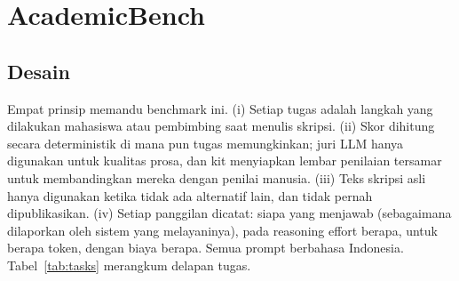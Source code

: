 \section{AcademicBench}
\label{sec:bench}

\subsection{Desain}
Empat prinsip memandu benchmark ini. (i) Setiap tugas adalah langkah yang dilakukan mahasiswa atau pembimbing saat menulis skripsi. (ii) Skor dihitung secara deterministik di mana pun tugas memungkinkan; juri LLM hanya digunakan untuk kualitas prosa, dan kit menyiapkan lembar penilaian tersamar untuk membandingkan mereka dengan penilai manusia. (iii) Teks skripsi asli hanya digunakan ketika tidak ada alternatif lain, dan tidak pernah dipublikasikan. (iv) Setiap panggilan dicatat: siapa yang menjawab (sebagaimana dilaporkan oleh sistem yang melayaninya), pada reasoning effort berapa, untuk berapa token, dengan biaya berapa. Semua prompt berbahasa Indonesia. Tabel~\ref{tab:tasks} merangkum delapan tugas.

